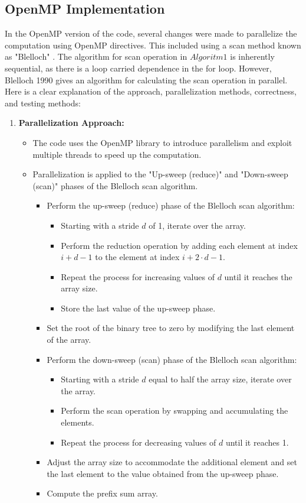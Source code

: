 \newpage

\subsection{OpenMP Implementation}
In the OpenMP version of the code, several changes were made to parallelize the computation using OpenMP directives. This included using a scan method known as "Blelloch" \cite{blelloch1990prefix}. The algorithm for scan operation in $Algoritm 1$ is inherently sequential, as there is a loop carried dependence in the for loop. However, Blelloch 1990 gives an algorithm for calculating the scan operation in parallel. Here is a clear explanation of the approach, parallelization methods, correctness, and testing methods:

\begin{enumerate}
  \item \textbf{Parallelization Approach:}
  \begin{itemize}
    \item The code uses the OpenMP library to introduce parallelism and exploit multiple threads to speed up the computation.
    \item Parallelization is applied to the "Up-sweep (reduce)" and "Down-sweep (scan)" phases of the Blelloch scan algorithm.

    \begin{itemize}
    \item Perform the up-sweep (reduce) phase of the Blelloch scan algorithm:
    \begin{itemize}
        \item Starting with a stride $d$ of 1, iterate over the array.
        \item Perform the reduction operation by adding each element at index $i + d - 1$ to the element at index $i + 2 \cdot d - 1$.
        \item Repeat the process for increasing values of $d$ until it reaches the array size.
        \item Store the last value of the up-sweep phase.
    \end{itemize}
    \item Set the root of the binary tree to zero by modifying the last element of the array.
    \item Perform the down-sweep (scan) phase of the Blelloch scan algorithm:
    \begin{itemize}
        \item Starting with a stride $d$ equal to half the array size, iterate over the array.
        \item Perform the scan operation by swapping and accumulating the elements.
        \item Repeat the process for decreasing values of $d$ until it reaches 1.
    \end{itemize}
    \item Adjust the array size to accommodate the additional element and set the last element to the value obtained from the up-sweep phase.
    \item Compute the prefix sum array.
    \end{itemize}
    

\end{itemize}
\end{enumerate}
